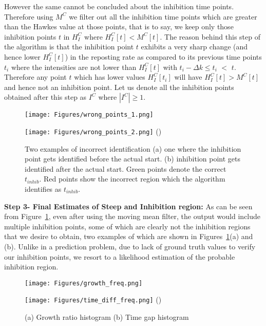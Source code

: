 \documentclass[smallextended]{svjour3}       %
\theoremstyle{definition}
\begin{document}
However the same cannot be concluded about the inhibition time points. Therefore using $M^C $ we filter out all the inhibition time points which are greater than the Hawkes value at those points, that is to say, we keep only those inhibition points $t $ in $H^C_I$ where $H^C_I [t] < M^C [t] $. The reason behind this step of the algorithm is that the inhibition point $t$ exhibits a very sharp change (and hence lower $H^C_I[t]$) in the reposting rate as compared to its previous time points $t_i$ where the intensities are not lower than $H^C_I [t] $ with $t_i - \Delta k \leq t_i$ $<$ $t$. Therefore any point $t$ which has lower values $H^C_I[t_i] $ will have $ H^C_I[t] > M^C[t] $ and hence not an inhibition point. Let us denote all the inhibition points obtained after this step as $I^C $ where $|I^C| \geq 1$.    


\begin{figure}[H]
	\centering
	\begin{minipage}{0.3\textwidth}
		\texttt{[image: Figures/wrong\_points\_1.png]}
		\hspace*{2cm}\subcaption{}
	\end{minipage}
	\hspace{3cm}
	\begin{minipage}{0.3\textwidth}
		\texttt{[image: Figures/wrong\_points\_2.png]}
		\hspace*{2cm}\subcaption()
	\end{minipage}
	\caption{Two examples of incorrect identification (a) one where the inhibition point gets identified before the actual start. (b) inhibition point gets identified after the actual start. Green points denote the correct $t_{inhib}$. Red points show the incorrect region which the algorithm identifies as $t_{inhib}$.}
	\label{fig:wrong_points}
\end{figure}


\textbf{Step 3- Final Estimates of Steep and Inhibition region:}
As can be seen from Figure~\ref{fig:wrong_points}, even after using the moving mean filter, the output would include multiple inhibition points, some of which are clearly not the inhibition regions that we desire to obtain, two examples of which are shown in Figures~\ref{fig:wrong_points}(a) and (b). Unlike in a prediction problem, due to lack of ground truth values to verify our inhibition points, we resort to a likelihood estimation of the probable inhibition region. 

\begin{figure}[H]
	\centering
	\begin{minipage}{0.3\textwidth}
		\texttt{[image: Figures/growth\_freq.png]}
		\hspace*{2cm}\subcaption{}
	\end{minipage}
	\hspace{3cm}
	\begin{minipage}{0.3\textwidth}
		\texttt{[image: Figures/time\_diff\_freq.png]}
		\hspace*{2cm}\subcaption()
	\end{minipage}
	\caption{(a) Growth ratio histogram (b) Time gap histogram}
	\label{fig:growth_hist}
\end{figure}
\end{document}
